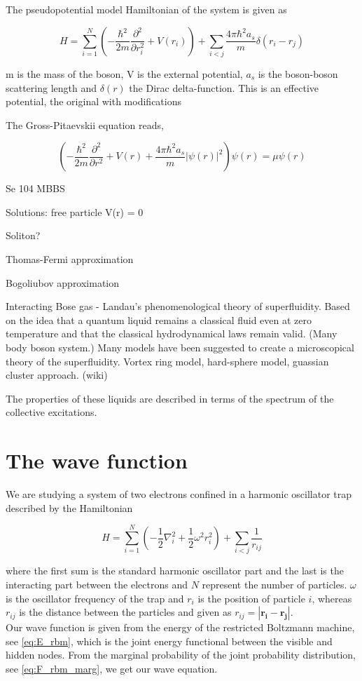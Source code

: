 The pseudopotential model Hamiltonian of the system is given as 

\begin{equation}
H = \sum_{i=1}^N \left( -\frac{\hbar^2}{2m} \frac{\partial^2}{\partial r_i^2} + V(r_i) \right) + \sum_{i<j} \frac{4 \pi \hbar^2 a_s}{m} \delta (r_i - r_j)
\end{equation}

m is the mass of the boson, V is the external potential, $a_s$ is the boson-boson scattering length and $\delta(r)$ the Dirac delta-function. This is an effective potential, the original  with modifications 

The Gross-Pitaevskii equation reads, 

\begin{equation}
\left( -\frac{\hbar^2}{2m} \frac{\partial^2}{\partial r^2} + V(r) + \frac{4 \pi \hbar^2 a_s}{m}|\psi(r)|^2 \right) \psi(r) = \mu \psi (r)
\end{equation}

Se 104 MBBS

Solutions: free particle V(r) = 0

Soliton?

Thomas-Fermi approximation

Bogoliubov approximation

Interacting Bose gas - Landau's phenomenological theory of superfluidity. Based on the idea that a quantum liquid remains a classical fluid even at zero temperature  and that the classical hydrodynamical laws remain valid. (Many body boson system.) 
Many models have been suggested to create a microscopical theory of the superfluidity. Vortex ring model, hard-sphere model, guassian cluster approach. (wiki)

The properties of these liquids are described in terms of the spectrum of the collective excitations.

\section{The wave function}
We are studying a system of two electrons confined in a harmonic oscillator trap described by the Hamiltonian 

\begin{equation}\label{eq:hamilt}
\hat{H} = \sum_{i=1}^N \left( - \frac{1}{2} \nabla_i^2 + \frac{1}{2} \omega^2 r_i^2 \right) + \sum_{i<j} \frac{1}{r_{ij}}
\end{equation}

where the first sum is the standard harmonic oscillator part and the last is the interacting part between the electrons and $N$ represent the number of particles. $\omega$ is the oscillator frequency of the trap and $r_i$ is the position of particle $i$, whereas $r_{ij}$ is the distance between the particles and given as $r_{ij} = |\mathbf{r_i} - \mathbf{r_j}|$. \\
Our wave function is given from the energy of the restricted Boltzmann machine, see \eqref{eq:E_rbm}, which is the joint energy functional between the visible and hidden nodes. From the marginal probability of the joint probability distribution, see \eqref{eq:F_rbm_marg}, we get our wave equation.                     

